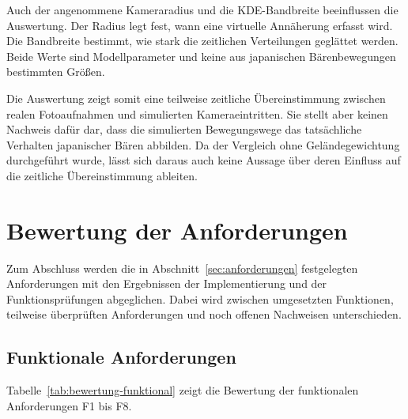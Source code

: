\documentclass[12pt,a4paper]{report}
\begin{document}
Auch der angenommene Kameraradius und die
KDE-Bandbreite beeinflussen die Auswertung.
Der Radius legt fest, wann eine virtuelle
Annäherung erfasst wird. Die Bandbreite bestimmt,
wie stark die zeitlichen Verteilungen geglättet
werden. Beide Werte sind Modellparameter
und keine aus japanischen Bärenbewegungen
bestimmten Größen.

Die Auswertung zeigt somit eine teilweise
zeitliche Übereinstimmung zwischen realen
Fotoaufnahmen und simulierten Kameraeintritten.
Sie stellt aber keinen Nachweis dafür dar,
dass die simulierten Bewegungswege das tatsächliche
Verhalten japanischer Bären abbilden.
Da der Vergleich ohne Geländegewichtung
durchgeführt wurde, lässt sich daraus auch
keine Aussage über deren Einfluss auf die
zeitliche Übereinstimmung ableiten.


\section{Bewertung der Anforderungen}
\label{sec:anforderungsbewertung}

Zum Abschluss werden die in
Abschnitt~\ref{sec:anforderungen}
festgelegten Anforderungen mit den
Ergebnissen der Implementierung und
der Funktionsprüfungen abgeglichen.
Dabei wird zwischen umgesetzten Funktionen,
teilweise überprüften Anforderungen
und noch offenen Nachweisen unterschieden.

\subsection*{Funktionale Anforderungen}

Tabelle~\ref{tab:bewertung-funktional}
zeigt die Bewertung der funktionalen
Anforderungen F1 bis F8.
\end{document}

